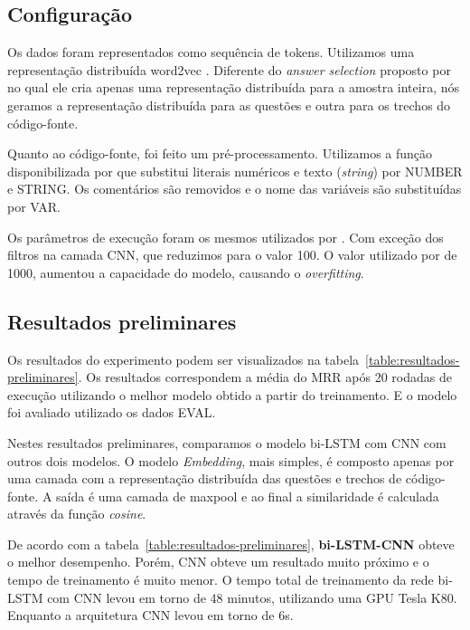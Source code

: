 \documentclass[12pt]{article}
\begin{document}
\subsection{Configuração}

Os dados foram representados como sequência de tokens. Utilizamos uma representação distribuída word2vec \cite{mikolov-word2vec-2013}. Diferente do \textit{answer selection} proposto por \cite{tan-lstm-qa} no qual ele cria apenas uma representação distribuída para a amostra inteira, nós geramos a representação distribuída para as questões e outra para os trechos do código-fonte.

Quanto ao código-fonte, foi feito um pré-processamento. Utilizamos a função disponibilizada por \cite{Yao-staqc:2018} que substitui literais numéricos e texto (\textit{string}) por NUMBER e STRING. Os comentários são removidos e o nome das variáveis são substituídas por VAR.

Os parâmetros de execução foram os mesmos utilizados por \cite{tan-lstm-qa}. Com exceção dos filtros na camada CNN, que reduzimos para o valor 100. O valor utilizado por \cite{tan-lstm-qa} de 1000, aumentou a capacidade do modelo, causando o \textit{overfitting}.




\subsection{Resultados preliminares}\label{sec:resultados-preliminares}

Os resultados do experimento podem ser visualizados na tabela~\ref{table:resultados-preliminares}. Os resultados correspondem a média do MRR após 20 rodadas de execução utilizando o melhor modelo obtido a partir do treinamento. E o modelo foi avaliado utilizado os dados EVAL. 

Nestes resultados preliminares, comparamos o modelo bi-LSTM com CNN com outros dois modelos. O modelo \emph{Embedding}, mais simples, é composto apenas por uma camada com a representação distribuída das questões e trechos de código-fonte. A saída é uma camada de maxpool e ao final a similaridade é calculada através da função \textit{cosine}. 

De acordo com a tabela~\ref{table:resultados-preliminares}, \textbf{bi-LSTM-CNN} obteve o melhor desempenho. Porém, CNN obteve um resultado muito próximo e o tempo de treinamento é muito menor. O tempo total de treinamento da rede bi-LSTM com CNN levou em torno de 48 minutos, utilizando uma GPU Tesla K80. Enquanto a arquitetura CNN levou em torno de 6s. 
\end{document}
